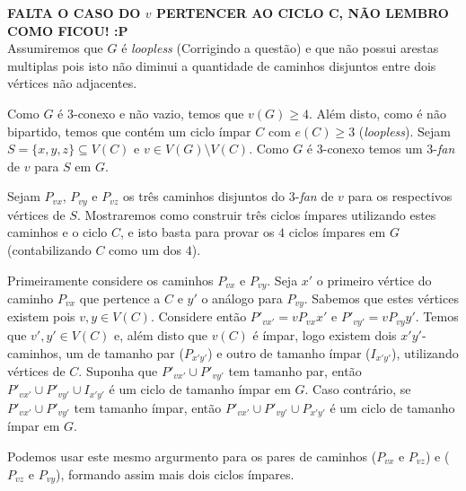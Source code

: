 
{\bf FALTA O CASO DO $v$ PERTENCER AO CICLO C, NÃO LEMBRO COMO FICOU! :P}\\


Assumiremos que $G$ é {\it loopless} (Corrigindo a questão) e que não
possui arestas multiplas pois isto não diminui a quantidade de caminhos disjuntos entre
dois vértices não adjacentes.

Como $G$ é 3-conexo e não vazio, temos que $v(G) \ge 4$. Além disto, como é não bipartido,
temos que contém um ciclo ímpar $C$ com $e(C) \ge 3$ ({\it loopless}).
Sejam $S =\{x,y,z\} \subseteq V(C)$ e $v \in V(G)\setminus V(C)$. Como $G$ é 3-conexo temos um $3$-{\it fan}
de $v$ para $S$ em $G$.

Sejam $P_{vx}$, $P_{vy}$ e $P_{vz}$ os três caminhos disjuntos do $3$-{\it fan} de $v$ para os respectivos
vértices de $S$. Mostraremos como construir três ciclos ímpares utilizando estes caminhos e o ciclo $C$, e isto
basta para provar os $4$ ciclos ímpares em $G$ (contabilizando $C$ como um dos $4$).

Primeiramente considere os caminhos $P_{vx}$ e $P_{vy}$. Seja $x'$ o primeiro vértice do caminho $P_{vx}$ que pertence a $C$
e $y'$ o análogo para $P_{vy}$. Sabemos que estes vértices existem pois $v,y \in V(C)$. Considere então $P'_{vx'} = vP_{vx}x'$ e
$P'_{vy'} = vP_{vy}y'$. Temos que $v',y' \in V(C)$ e, além disto que $v(C)$ é ímpar, logo existem dois $x'y'$-caminhos, um de 
tamanho par ($P_{x'y'}$) e outro de tamanho ímpar ($I_{x'y'}$), utilizando vértices de $C$.
Suponha que $P'_{vx'} \cup P'_{vy'}$ tem tamanho par, então $P'_{vx'} \cup P'_{vy'} \cup I_{x'y'}$ é um ciclo de tamanho ímpar em $G$.
Caso contrário, se $P'_{vx'} \cup P'_{vy'}$ tem tamanho ímpar, então $P'_{vx'} \cup P'_{vy'} \cup P_{x'y'}$ é um ciclo de tamanho ímpar em $G$.

Podemos usar este mesmo argurmento para os pares de caminhos ($P_{vx}$ e $P_{vz}$) e ($P_{vz}$ e $P_{vy}$), formando assim mais dois ciclos ímpares.
\fimprova

